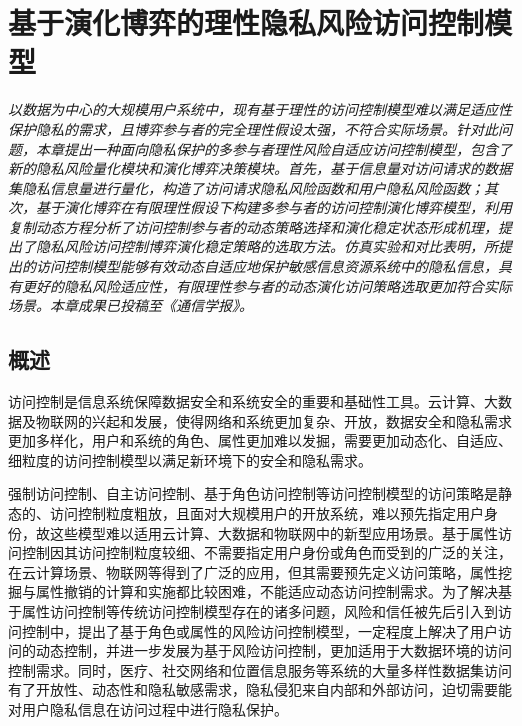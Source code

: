 \chapter{基于演化博弈的理性隐私风险访问控制模型}
\label{chap:evolutionary-rabac}

\textit{ }

\textit{以数据为中心的大规模用户系统中，现有基于理性的访问控制模型难以满足适应性保护隐私的需求，且博弈参与者的完全理性假设太强，不符合实际场景。针对此问题，本章提出一种面向隐私保护的多参与者理性风险自适应访问控制模型，包含了新的隐私风险量化模块和演化博弈决策模块。首先，基于信息量对访问请求的数据集隐私信息量进行量化，构造了访问请求隐私风险函数和用户隐私风险函数；其次，基于演化博弈在有限理性假设下构建多参与者的访问控制演化博弈模型，利用复制动态方程分析了访问控制参与者的动态策略选择和演化稳定状态形成机理，提出了隐私风险访问控制博弈演化稳定策略的选取方法。仿真实验和对比表明，所提出的访问控制模型能够有效动态自适应地保护敏感信息资源系统中的隐私信息，具有更好的隐私风险适应性，有限理性参与者的动态演化访问策略选取更加符合实际场景。本章成果已投稿至《通信学报》。}

\section{概述}
访问控制是信息系统保障数据安全和系统安全的重要和基础性工具\cite{sandhu1994access}。云计算、大数据及物联网的兴起和发展，使得网络和系统更加复杂、开放，数据安全和隐私需求更加多样化，用户和系统的角色、属性更加难以发掘，需要更加动态化、自适应、细粒度的访问控制模型以满足新环境下的安全和隐私需求\cite{li2017access}。

强制访问控制\cite{mccune2006shamon}、自主访问控制\cite{downs1985issues}、基于角色访问控制\cite{sandhu1996role}等访问控制模型的访问策略是静态的、访问控制粒度粗放，且面对大规模用户的开放系统，难以预先指定用户身份，故这些模型难以适用云计算、大数据和物联网中的新型应用场景。基于属性访问控制\cite{wang2010hierarchical}因其访问控制粒度较细、不需要指定用户身份或角色而受到的广泛的关注，在云计算场景、物联网等得到了广泛的应用，但其需要预先定义访问策略，属性挖掘与属性撤销的计算和实施都比较困难，不能适应动态访问控制需求\cite{servos2017current}。为了解决基于属性访问控制等传统访问控制模型存在的诸多问题，风险和信任被先后引入到访问控制中，提出了基于角色或属性的风险访问控制模型\cite{dimmock2004using,kandala2011attribute,krautsevich2014towards}，一定程度上解决了用户访问的动态控制，并进一步发展为基于风险访问控制\cite{cheng2007fuzzy,ni2010risk}，更加适用于大数据环境的访问控制需求。同时，医疗、社交网络和位置信息服务等系统的大量多样性数据集访问有了开放性、动态性和隐私敏感需求，隐私侵犯来自内部和外部访问\cite{boulares2017insider}，迫切需要能对用户隐私信息在访问过程中进行隐私保护。


